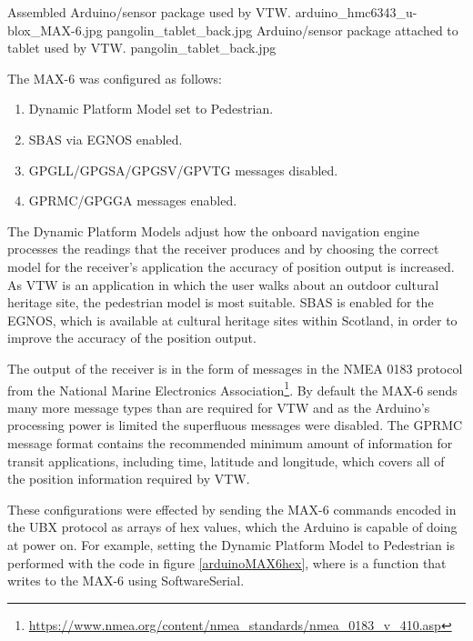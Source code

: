  {Assembled Arduino/sensor package used by VTW.} {arduino_hmc6343_u-blox_MAX-6.jpg}
       {pangolin_tablet_back.jpg} {Arduino/sensor package attached to tablet used by VTW.} {pangolin_tablet_back.jpg}
       

The MAX-6 was configured as follows:

\begin{enumerate}
	\item Dynamic Platform Model set to Pedestrian.
	\item SBAS via EGNOS enabled.
	\item GPGLL/GPGSA/GPGSV/GPVTG messages disabled.
	\item GPRMC/GPGGA messages enabled.
\end{enumerate}

The Dynamic Platform Models adjust how the onboard navigation engine processes the readings that the receiver produces and by choosing the correct model for the receiver's application the accuracy of position output is increased. As VTW is an application in which the user walks about an outdoor cultural heritage site, the pedestrian model is most suitable. SBAS is enabled for the EGNOS, which is available at cultural heritage sites within Scotland, in order to improve the accuracy of the position output.

The output of the receiver is in the form of messages in the NMEA 0183 protocol from the National Marine Electronics Association\footnote{\url{https://www.nmea.org/content/nmea_standards/nmea_0183_v_410.asp}}. By default the MAX-6 sends many more message types than are required for VTW and as the Arduino's processing power is limited the superfluous messages were disabled. The GPRMC message format contains the recommended minimum amount of information for transit applications, including time, latitude and longitude, which covers all of the position information required by VTW.

These configurations were effected by sending the MAX-6 commands encoded in the UBX protocol as arrays of hex values, which the Arduino is capable of doing at power on. For example, setting the Dynamic Platform Model to Pedestrian is performed with the code in figure \ref{arduinoMAX6hex}, where  is a function that writes to the MAX-6 using SoftwareSerial.

